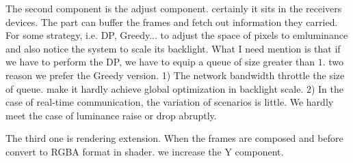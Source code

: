 The second component is the adjust component. certainly it sits in the
receivers devices. The part can buffer the frames and fetch out
information they carried. For some strategy, i.e. DP, Greedy... to
adjust the space of pixels to emluminance and also notice the system
to scale its backlight. What I need mention is that if we have to
perform the DP, we have to equip a queue of size greater than
$1$. two reason we prefer the Greedy version.
1) The network bandwidth throttle the size of queue. make it hardly
achieve global optimization in backlight scale. 
2) In the case of real-time communication, the variation of scenarios
is little. We hardly meet the case of luminance raise or drop
abruptly.

The third one is rendering extension. When the frames are composed and
before convert to RGBA format in shader. we increase the Y component. 

